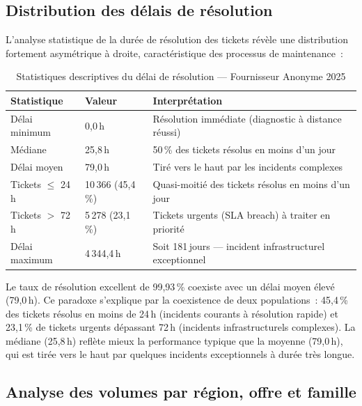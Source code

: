 \documentclass[10pt,a4paper]{report}
\newcommand{\insight}[2]{%
  \begin{tcolorbox}[insightbox, title=#1]
    #2
  \end{tcolorbox}%
}
\begin{document}
\subsection{Distribution des délais de résolution}

L'analyse statistique de la durée de résolution des tickets révèle une distribution fortement asymétrique à droite, caractéristique des processus de maintenance~:

\begin{table}[H]
\centering
\caption{Statistiques descriptives du délai de résolution --- Fournisseur Anonyme 2025}
\begin{tabularx}{\textwidth}{L{4cm} C{3cm} L{7cm}}
\toprule
{}
\textbf{\color{ttblue}Statistique} & \textbf{\color{ttblue}Valeur} & \textbf{\color{ttblue}Interprétation} \\
\midrule
Délai minimum         & 0,0\,h    & Résolution immédiate (diagnostic à distance réussi) \\
Médiane               & 25,8\,h   & 50\,\% des tickets résolus en moins d'un jour \\
Délai moyen           & 79,0\,h   & Tiré vers le haut par les incidents complexes \\
Tickets $\leq$ 24\,h  & 10\,366 (45,4\,\%) & Quasi-moitié des tickets résolus en moins d'un jour \\
Tickets $>$ 72\,h     & 5\,278 (23,1\,\%) & Tickets urgents (SLA breach) à traiter en priorité \\
Délai maximum         & 4\,344,4\,h & Soit 181\,jours --- incident infrastructurel exceptionnel \\
\bottomrule
\end{tabularx}
\label{tab:stats-delai}
\end{table}

\insight{Paradoxe Performance/Délais}{Le taux de résolution excellent de 99,93\,\% coexiste avec un délai moyen élevé (79,0\,h). Ce paradoxe s'explique par la coexistence de deux populations~: 45,4\,\% des tickets résolus en moins de 24\,h (incidents courants à résolution rapide) et 23,1\,\% de tickets urgents dépassant 72\,h (incidents infrastructurels complexes). La médiane (25,8\,h) reflète mieux la performance typique que la moyenne (79,0\,h), qui est tirée vers le haut par quelques incidents exceptionnels à durée très longue.}

\subsection{Analyse des volumes par région, offre et famille}
\end{document}
